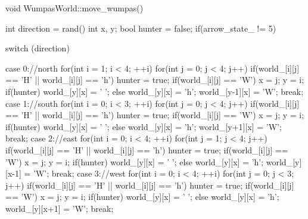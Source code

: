 \begin{answercode}
void WumpasWorld::move_wumpas()
{
    int direction = rand() %
    int x, y;
    bool hunter = false;
    if(arrow_state_ != 5)
    {
        switch (direction)
        {
            case 0://north
                for(int i = 1; i < 4; ++i)
                {
                    for(int j = 0; j < 4; j++)
                    {
                        if(world_[i][j] == 'H' || world_[i][j] == 'h')
                            hunter = true;
                        if(world_[i][j] == 'W')
                        {
                            x = j;
                            y = i;
                        }
                    }
                }
                if(hunter)
                    world_[y][x] = ' ';
                else
                    world_[y][x] = 'h';
                world_[y-1][x] = 'W'; 
                break;
            case 1://south
                for(int i = 0; i < 3; ++i)
                {
                    for(int j = 0; j < 4; j++)
                    {
                        if(world_[i][j] == 'H' || world_[i][j] == 'h')
                            hunter = true;
                        if(world_[i][j] == 'W')
                        {
                            x = j;
                            y = i;
                        }
                    }
                }
                if(hunter)
                    world_[y][x] = ' ';
                else
                    world_[y][x] = 'h';
                world_[y+1][x] = 'W'; 
                break;
            case 2://east
                for(int i = 0; i < 4; ++i)
                {
                    for(int j = 1; j < 4; j++)
                    {
                        if(world_[i][j] == 'H' || world_[i][j] == 'h')
                            hunter = true;
                        if(world_[i][j] == 'W')
                        {
                            x = j;
                            y = i;
                        }
                    }
                }
                if(hunter)
                    world_[y][x] = ' ';
                else
                    world_[y][x] = 'h';
                world_[y][x-1] = 'W'; 
                break;
            case 3://west
                for(int i = 0; i < 4; ++i)
                {
                    for(int j = 0; j < 3; j++)
                    {
                        if(world_[i][j] == 'H' || world_[i][j] == 'h')
                            hunter = true;
                        if(world_[i][j] == 'W')
                        {
                            x = j;
                            y = i;
                        }
                    }
                }
                if(hunter)
                    world_[y][x] = ' ';
                else
                    world_[y][x] = 'h';
                world_[y][x+1] = 'W'; 
                break;



}}}
\end{answercode}
